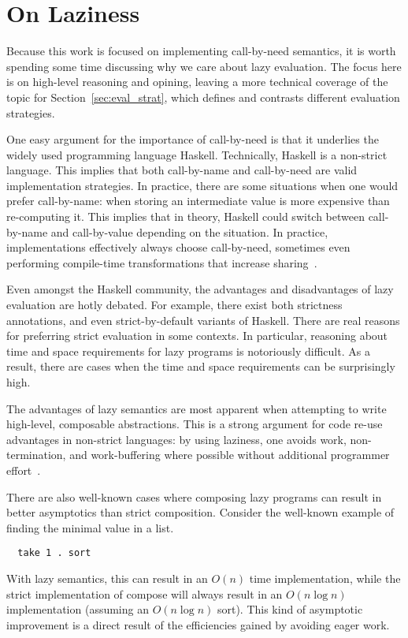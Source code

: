 \section{On Laziness}

Because this work is focused on implementing call-by-need semantics, it is worth
spending some time discussing why we care about lazy evaluation. The focus here
is on high-level reasoning and opining, leaving a more technical coverage
of the topic for Section~\ref{sec:eval_strat}, which defines and contrasts
different evaluation strategies.

One easy argument for the importance of call-by-need is that it underlies the
widely used programming language Haskell. Technically, Haskell is a non-strict
language.  This implies that both call-by-name and call-by-need are valid
implementation strategies. In practice, there are some situations when one would
prefer call-by-name: when storing an intermediate value is more expensive than
re-computing it. This implies that in theory, Haskell could switch between
call-by-name and call-by-value depending on the situation. In practice,
implementations effectively always choose call-by-need, sometimes even
performing compile-time transformations that increase
sharing~\cite{jones96floating}.  

Even amongst the Haskell community, the advantages and disadvantages of
lazy evaluation are hotly debated. For example, there exist both strictness
annotations, and even strict-by-default variants of Haskell. There are real
reasons for preferring strict evaluation in some contexts. In particular,
reasoning about time and space requirements for lazy programs is notoriously
difficult. As a result, there are cases when the time and space requirements can
be surprisingly high.

The advantages of lazy semantics are most apparent when attempting to write
high-level, composable abstractions. This is a strong argument for code re-use
advantages in non-strict languages: by using laziness, one avoids work,
non-termination, and work-buffering where possible without additional programmer
effort~\cite{hughes1989functional}.

There are also well-known cases where composing lazy programs can result in
better asymptotics than strict composition. Consider the well-known example of
finding the minimal value in a list. 
\begin{verbatim}
  take 1 . sort
\end{verbatim}
With lazy semantics, this can result in an $O(n)$ time implementation, while the
strict implementation of compose will always result in an $O(n \log n)$
implementation (assuming an $O(n \log n)$ sort). This kind of asymptotic
improvement is a direct result of the efficiencies gained by avoiding eager
work. 

